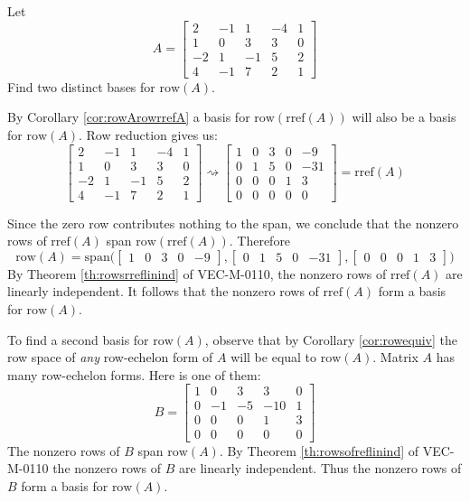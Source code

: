 \documentclass{ximera}
\begin{document}
\begin{example}\label{ex:basisrowspace}
Let
$$A=\begin{bmatrix}2&-1&1&-4&1\\1&0&3&3&0\\-2&1&-1&5&2\\4&-1&7&2&1\end{bmatrix}$$
Find two distinct bases for $\mbox{row}(A)$.
\begin{explanation}
By Corollary \ref{cor:rowArowrrefA} a basis for $\mbox{row}(\mbox{rref}(A))$ will also be a basis for $\mbox{row}(A)$. Row reduction gives us:
$$\begin{bmatrix}2&-1&1&-4&1\\1&0&3&3&0\\-2&1&-1&5&2\\4&-1&7&2&1\end{bmatrix}\rightsquigarrow\begin{bmatrix}1&0&3&0&-9\\0&1&5&0&-31\\0&0&0&1&3\\0&0&0&0&0\end{bmatrix}=\mbox{rref}(A)$$

Since the zero row contributes nothing to the span, we conclude that the nonzero rows of $\mbox{rref}(A)$ span $\mbox{row}(\mbox{rref}(A))$.  Therefore
$$\mbox{row}(A)=\mbox{span}\Big(\begin{bmatrix}1&0&3&0&-9\end{bmatrix},
\begin{bmatrix}0&1&5&0&-31\end{bmatrix},
\begin{bmatrix}0&0&0&1&3\end{bmatrix}\Big)$$
By Theorem \ref{th:rowsrreflinind} of VEC-M-0110, the nonzero rows of $\mbox{rref}(A)$ are linearly independent.
It follows that the nonzero rows of $\mbox{rref}(A)$ form a basis for $\mbox{row}(A)$.

To find a second basis for $\mbox{row}(A)$, observe that by Corollary \ref{cor:rowequiv} the row space of {\it any} row-echelon form of $A$ will be equal to $\mbox{row}(A)$.  Matrix $A$ has many row-echelon forms.  Here is one of them:
$$B=\begin{bmatrix}1&0&3&3&0\\0&-1&-5&-10&1\\0&0&0&1&3\\0&0&0&0&0 \end{bmatrix}$$
The nonzero rows of $B$ span $\mbox{row}(A)$.  By Theorem \ref{th:rowsofreflinind} of VEC-M-0110 the nonzero rows of $B$ are linearly independent.  Thus the nonzero rows of $B$ form a basis for $\mbox{row}(A)$.
\end{explanation}
\end{example}
\end{document}
